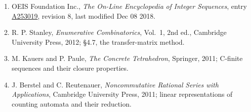 \documentclass[11pt]{article}
\theoremstyle{definition}
\begin{document}
\begin{enumerate}

\item OEIS Foundation Inc., \emph{The On-Line Encyclopedia of Integer Sequences}, entry \href{https://oeis.org/A253019}{A253019}, revision 8, last modified Dec 08 2018.

\item R. P. Stanley, \emph{Enumerative Combinatorics}, Vol.~1, 2nd ed., Cambridge University Press, 2012; \S4.7, the transfer-matrix method.

\item M. Kauers and P. Paule, \emph{The Concrete Tetrahedron}, Springer, 2011; C-finite sequences and their closure properties.

\item J. Berstel and C. Reutenauer, \emph{Noncommutative Rational Series with Applications}, Cambridge University Press, 2011; linear representations of counting automata and their reduction.

\end{enumerate}
\end{document}
